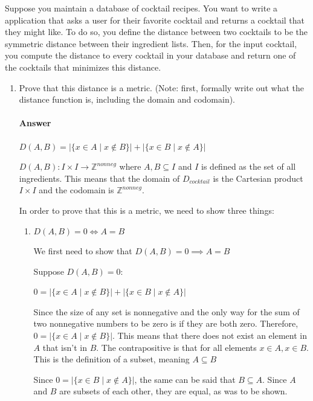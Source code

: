 \documentclass{article}
\begin{document}
Suppose you maintain a database of cocktail recipes.  You want to write a
application that asks a user for their favorite cocktail and returns a cocktail
that they might like.  To do so, you define the distance between two cocktails
to be the symmetric distance between their ingredient lists.  Then, for the
input cocktail, you compute the distance to every cocktail in your database and
return one of the cocktails that minimizes this distance.

\begin{enumerate}

    \item Prove that this distance is a metric. (Note: first, formally write out
        what the distance function is, including the domain and codomain).

        \paragraph{Answer}
        $D(A, B) = |\{x \in A \mid x \notin B\}| + |\{x \in B \mid x \notin A\}|$
       
       $D(A, B)\colon I\times I\to \mathbb{Z}^{nonneg}$ where $A, B \subseteq I$ 
       and $I$ is defined as the set of all ingredients. This means that the domain of $D_{cocktail}$ is the Cartesian product $I\times I$ and the codomain is $\mathbb{Z}^{nonneg}$.
       
       In order to prove that this is a metric, we need to show three things:
       \begin{enumerate}
       
       \item $D(A, B) = 0 \iff A=B$
       
       We first need to show that $D(A,B) = 0 \implies A=B$
       
       Suppose $D(A,B) = 0$:
       
       $0 = |\{x \in A \mid x \notin B\}| + |\{x \in B \mid x \notin A\}|$
       
       Since the size of any set is nonnegative and the only way for the sum of two nonnegative numbers to be zero is if they are both zero. Therefore, $0 = |\{x \in A \mid x \notin B\}|$. This means that there does not exist an element in $A$ that isn't in $B$. The contrapositive is that for all elements $x \in A, x \in B$. This is the definition of a subset, meaning $A \subseteq B$
       
       Since $0 = |\{x \in B \mid x \notin A\}|$, the same can be said that $B \subseteq A$. Since $A$ and $B$ are subsets of each other, they are equal, as was to be shown.
       

\end{enumerate}
\end{enumerate}
\end{document}
